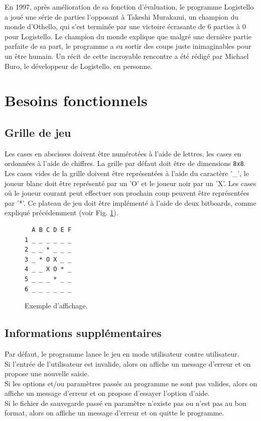 \documentclass[10pt,a4paper]{article}
\begin{document}
En 1997, après amélioration de sa fonction d'évaluation, le programme Logistello a joué une série de parties l'opposant à Takeshi Murakami, un champion du monde d'Othello, qui s'est terminée par une victoire écrasante de 6 parties à 0 pour Logistello. Le champion du monde explique que malgré une dernière partie parfaite de sa part, le programme a su sortir des coups juste inimaginables pour un être humain. Un récit de cette incroyable rencontre a été rédigé par Michael Buro, le développeur de Logistello, en personne\cite{Bur97b}.

\section{Besoins fonctionnels}
\label{sec:besoins_fonctionnels}

\subsection{Grille de jeu}
\label{board}

Les cases en abscisses doivent être numérotées à l'aide de lettres, les cases en ordonnées à l'aide de chiffres. La grille par défaut doit être de dimensions \verb!8x8!. Les cases vides de la grille doivent être représentées à l'aide du caractère '\_', le joueur blanc doit être représenté par un 'O' et le joueur noir par un 'X'. Les cases où le joueur courant peut effectuer son prochain coup peuvent être représentées par '*'. Ce plateau de jeu doit être implémenté à l'aide de deux bitboards, comme expliqué précédemment (voir Fig. \ref{fig:exemple_board}).

\begin{figure}[H]    
\centering
\begin{BVerbatim}
  A B C D E F
1 _ _ _ _ _ _
2 _ _ * _ _ _
3 _ * O X _ _
4 _ _ X O * _
5 _ _ _ * _ _
6 _ _ _ _ _ _  
\end{BVerbatim}
\caption{Exemple d'affichage.\label{fig:exemple_board}}
\end{figure}

\subsection{Informations supplémentaires}
Par défaut, le programme lance le jeu en mode utilisateur contre utilisateur.\\
Si l'entrée de l'utilisateur est invalide, alors on affiche un message d'erreur et on propose une nouvelle saisie.\\
Si les options et/ou paramètres passés au programme ne sont pas valides, alors on affiche un message d'erreur et on propose d'essayer l'option d'aide.\\
Si le fichier de sauvegarde passé en paramètre n'existe pas ou n'est pas au bon format, alors on affiche un message d'erreur et on quitte le programme.
\end{document}
